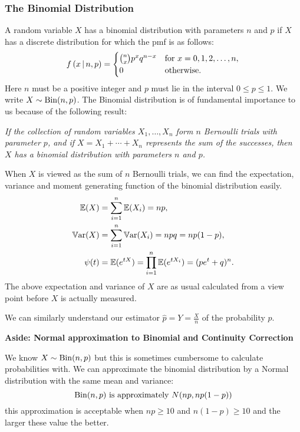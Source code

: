\documentclass[10pt, a4paper]{article}
\begin{document}
\subsubsection{The Binomial Distribution}
\begin{definition}
    A random variable $X$ has a binomial distribution with parameters $n$ and $p$ if $X$ has a discrete distribution for which the pmf is as follows:
    \[
    f\left(x \,\middle|\, n, p\right) = \begin{cases}
        \binom{n}{x}p ^ xq ^ {n - x} & \text{for } x = 0, 1, 2, \dotsc, n, \\
        0 & \text{otherwise}.
    \end{cases}
    \]
    Here $n$ must be a positive integer and $p$ must lie in the interval $0 \leq p \leq 1$.
    We write $X \sim \operatorname{Bin}(n, p)$.
    The Binomial distribution is of fundamental importance to us because of the following result:

    \textit{If the collection of random variables $X_1, \dotsc, X_n$ form $n$ Bernoulli trials with parameter $p$,
    and if $X = X_1 + \dotsi + X_n$ represents the sum of the successes,
    then $X$ has a binomial distribution with parameters $n$ and $p$.}
\end{definition}

When $X$ is viewed as the sum of $n$ Bernoulli trials,
we can find the expectation,
variance and moment generating function of the binomial distribution easily.
\begin{align*}
    \mathbb{E}(X) &= \sum_{i = 1}^{n}\mathbb{E}(X_i) = np, \\
    \mathbb{V}\mathrm{ar}(X) &= \sum_{i = 1}^{n}\mathbb{V}\mathrm{ar}(X_i) = npq = np(1 - p), \\
    \psi(t) &= \mathbb{E}(e ^ {tX}) = \prod_{i = 1}^{n}\mathbb{E}(e ^ {tX_i}) = (pe ^ t + q) ^ n.
\end{align*}
The above expectation and variance of $X$ are as usual calculated from a view point before $X$ is actually measured.

We can similarly understand our estimator $\hat{p} = Y = \frac{X}{n}$ of the probability $p$.



\textbf{Aside:
Normal approximation to Binomial and Continuity Correction}

We know $X \sim \operatorname{Bin}(n, p)$ but this is sometimes cumbersome to calculate probabilities with.
We can approximate the binomial distribution by a Normal distribution with the same mean and variance:
\[
\operatorname{Bin}(n, p)\text{ is approximately } N(np, np(1 - p))
\]
this approximation is acceptable when $np \geq 10$ and $n(1 - p) \geq 10$ and the larger these value the better.
\end{document}
